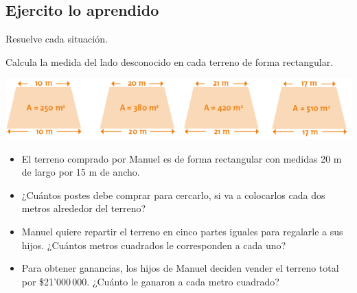 \documentclass[letterpaper,11pt,twoside]{article}
\begin{document}
\begin{multicols}{2}
\section*{Ejercito lo aprendido}
Resuelve cada situación.

Calcula la medida del lado desconocido en cada terreno de forma rectangular.
\begin{center}
\includegraphics[scale=.4]{Images/trapecios.png} 
\end{center}
\begin{itemize}
\item El terreno comprado por Manuel es de forma rectangular con medidas 20 m de largo por 15 m de ancho.
\item ¿Cuántos postes debe comprar para cercarlo, si va a colocarlos cada dos metros alrededor del terreno?
\item Manuel quiere repartir el terreno en cinco partes iguales para regalarle a sus hijos. ¿Cuántos metros cuadrados le corresponden a cada uno?
\item Para obtener ganancias, los hijos de Manuel deciden vender el terreno total por \$21'000\,000. ¿Cuánto le ganaron a cada metro cuadrado?
\end{itemize}
\end{multicols}
\end{document}
